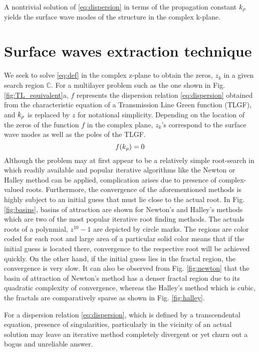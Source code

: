 \documentclass[12pt]{article}
\begin{document}
A nontrivial solution of \eqref{eq:dispersion} in terms of the propagation constant $k_{\rho}$ yields the surface wave modes of the structure in the complex k-plane.
\section{Surface waves extraction technique}
%
We seek to solve \eqref{eq:def} in the complex z-plane to obtain the zeros, $z_k$ in a given search region $\mathbb{C}$. For a multilayer problem such as the one shown in Fig. \ref{fig:TL_equivalent}a, $f$ represents the dispersion relation \eqref{eq:dispersion} obtained from the characteristic equation of a Transmission Line Green function (TLGF), and $k_{\rho}$ is replaced by $z$ for notational simplicity. Depending on the location of the zeros of the function $f$ in the complex plane, $z_k$'s correspond to the surface wave modes as well as the poles of the TLGF.
%
\begin{equation}
  f(k_{\rho}) = 0
  \label{eq:def}
\end{equation}
%
Although the problem may at first appear to be a relatively simple root-search in which readily available and popular iterative algorithms like the Newton or Halley method can be applied, complication arises due to presence of complex-valued roots. Furthermore, the convergence of the aforementioned methods is highly subject to an initial guess that must lie close to the actual root. In Fig. \ref{fig:basins}, basins of attraction are shown for Newton's and Halley's methods which are two of the most popular iterative root finding methods. The actuals roots of a polynmial, $z^{10}-1$ are depicted by circle marks. The regions are color coded for each root and large area of a particular solid color means that if the initial guess is located there, convergence to the respective root will be achieved quickly. On the other hand, if the initial guess lies in the fractal region, the convergence is very slow. It can also be observed from Fig. \ref{fig:newton} that the basin of attraction of Newton's method has a denser fractal region due to its quadratic complexity of convergence, whereas the Halley's method which is cubic, the fractals are
comparatively sparse as shown in Fig. \ref{fig:halley}.

For a dispersion relation \eqref{eq:dispersion}, which is defined by a transcendental equation, presence of singularities, particularly in the vicinity of an actual solution may leave an iterative method completely divergent or yet churn out a bogus and unreliable answer.
\end{document}
